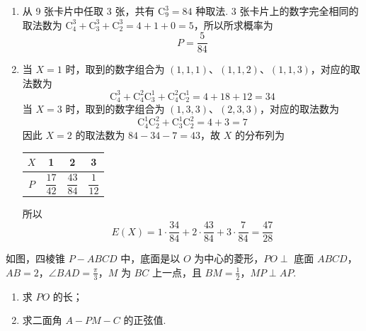 \begin{solution}
\begin{enumerate}
\item 从 9 张卡片中任取 3 张，共有 \(\mathrm C_9^3=84\) 种取法. 3 张卡片上的数字完全相同的取法数为
\(\mathrm C_4^3+\mathrm C_3^3+\mathrm C_2^3=4+1+0=5\)，所以所求概率为
\[
P=\frac{5}{84}
\]

\item 当 \(X=1\) 时，取到的数字组合为 \((1,1,1)\)、\((1,1,2)\)、\((1,1,3)\)，对应的取法数为
\[
\mathrm C_4^3+\mathrm C_4^2\mathrm C_3^1+\mathrm C_4^2\mathrm C_2^1
 =4+18+12=34
\]
当 \(X=3\) 时，取到的数字组合为 \((1,3,3)\)、\((2,3,3)\)，对应的取法数为
\[
\mathrm C_4^1\mathrm C_2^2+\mathrm C_3^1\mathrm C_2^2=4+3=7
\]
因此 \(X=2\) 的取法数为 \(84-34-7=43\)，故 \(X\) 的分布列为

\begin{center}
\begin{tabular}{c|ccc}
\(X\) & 1 & 2 & 3 \\
\hline
\(P\) & \(\dfrac{17}{42}\) & \(\dfrac{43}{84}\) & \(\dfrac{1}{12}\) \\
\end{tabular}
\end{center}

所以
\[
E(X)=1\cdot\frac{34}{84}+2\cdot\frac{43}{84}+3\cdot\frac{7}{84}
 =\frac{47}{28}
\]
\end{enumerate}
\end{solution}

\begin{problem}
如图，四棱锥 \(P - ABCD\) 中，底面是以 \(O\) 为中心的菱形，\(PO \perp\) 底面 \(ABCD\)，\(AB = 2\)，\(\angle BAD = \frac{\pi}{3}\)，\(M\) 为 \(BC\) 上一点，且 \(BM = \frac{1}{2}\)，\(MP \perp AP\).

\begin{enumerate}
\item 求 \(PO\) 的长；
\item 求二面角 \(A - PM - C\) 的正弦值.
\end{enumerate}

\end{problem}

